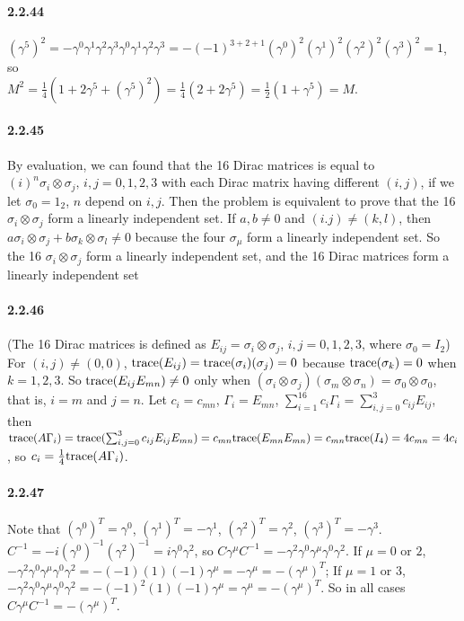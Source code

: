 \documentclass[a4paper]{article}
\begin{document}
\paragraph{2.2.44}
$(\gamma^5)^2=-\gamma^0\gamma^1\gamma^2\gamma^3\gamma^0\gamma^1\gamma^2\gamma^3=-(-1)^{3+2+1}(\gamma^0)^2(\gamma^1)^2(\gamma^2)^2(\gamma^3)^2=1$, so\\ $M^2=\frac{1}{4}(1+2\gamma^5+(\gamma^5)^2)=\frac{1}{4}(2+2\gamma^5)=\frac{1}{2}(1+\gamma^5)=M$.

\paragraph{2.2.45}
By evaluation, we can found that the 16 Dirac matrices is equal to $(i)^n\sigma_i\otimes\sigma_j,\,i,j=0,1,2,3$ with each Dirac matrix having different $(i,j)$, if we let $\sigma_0=1_2$, $n$ depend on $i,j$. Then the problem is equivalent to prove that the 16 $\sigma_i\otimes\sigma_j$ form a linearly independent set. If $a,b\neq0$ and $(i.j)\neq(k,l)$, then  $a\sigma_i\otimes\sigma_j+b\sigma_k\otimes\sigma_l\neq0$ because the four $\sigma_\mu$ form a linearly independent set. So the 16 $\sigma_i\otimes\sigma_j$ form a linearly independent set, and the 16 Dirac matrices form a linearly independent set

\paragraph{2.2.46}
(The 16 Dirac matrices is defined as $E_{ij}=\sigma_i\otimes\sigma_j$, $i,j=0,1,2,3$, where $\sigma_0=I_2$) \\For $(i,j)\neq(0,0)$, $\mathrm{trace}(E_{ij})=\mathrm{trace}(\sigma_i)(\sigma_j)=0$ because $\mathrm{trace}(\sigma_k)=0$ when $k=1,2,3$. So $\mathrm{trace}(E_{ij}E_{mn})\neq0$ only when $(\sigma_i\otimes\sigma_j)(\sigma_m\otimes\sigma_n)=\sigma_0\otimes\sigma_0$, that is, $i=m$ and $j=n$. Let $c_i=c_{mn}$, $\Gamma_i=E_{mn}$,  $\sum_{i=1}^{16}c_i\Gamma_i=\sum_{i,j=0}^3c_{ij}E_{ij}$, then $\mathrm{trace}(A\Gamma_i)=\mathrm{trace}(\sum_{i,j=0}^3c_{ij}E_{ij}E_{mn})=c_{mn}\mathrm{trace}(E_{mn}E_{mn})=c_{mn}\mathrm{trace}(I_4)=4c_{mn}=4c_i$, so $c_i=\frac{1}{4}\mathrm{trace}(A\Gamma_i)$.

\paragraph{2.2.47}
Note that $(\gamma^0)^T=\gamma^0$, $(\gamma^1)^T=-\gamma^1$, $(\gamma^2)^T=\gamma^2$, $(\gamma^3)^T=-\gamma^3$. $C^{-1}=-i(\gamma^0)^{-1}(\gamma^2)^{-1}=i\gamma^0\gamma^2$, so $C\gamma^\mu C^{-1}=-\gamma^2\gamma^0\gamma^\mu\gamma^0\gamma^2$. If $\mu=0$ or $2$, $-\gamma^2\gamma^0\gamma^\mu\gamma^0\gamma^2=-(-1)(1)(-1)\gamma^\mu=-\gamma^\mu=-(\gamma^\mu)^T$; If $\mu=1$ or $3$, $-\gamma^2\gamma^0\gamma^\mu\gamma^0\gamma^2=-(-1)^2(1)(-1)\gamma^\mu=\gamma^\mu=-(\gamma^\mu)^T$. So in all cases $C\gamma^\mu C^{-1}=-(\gamma^\mu)^T$.
\end{document}
